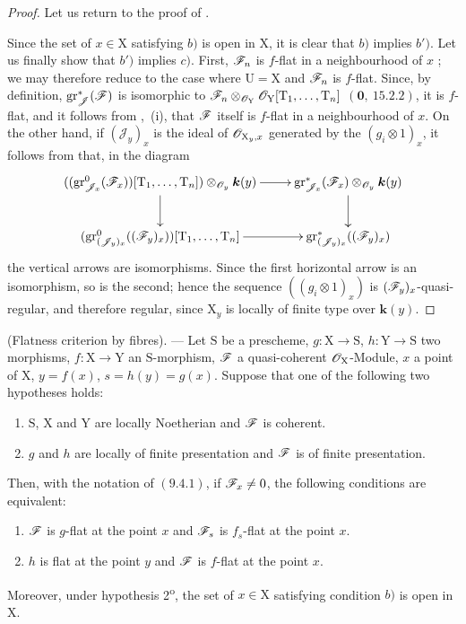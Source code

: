 \begin{proof}
Let us return to the proof of .

Since the set of $x\in\mathrm{X}$ satisfying $b)$ is open in $\mathrm{X}$, it is clear that $b)$ implies $b')$. Let us finally show that $b')$ implies $c)$. First, $\mathscr{F}_n$ is $f$-flat in a neighbourhood of $x$ ; we may therefore reduce to the case where $\mathrm{U}=\mathrm{X}$ and $\mathscr{F}_n$ is $f$-flat. Since, by definition, $\operatorname{gr}^*_\mathscr{J}(\mathscr{F})$ is isomorphic to $\mathscr{F}_n\otimes_{\mathscr{O}_\mathrm{Y}}\mathscr{O}_\mathrm{Y}[\mathrm{T}_1,\ldots,\mathrm{T}_n]$ $(\mathbf{0},~15.2.2)$, it is $f$-flat, and it follows from ,~(i), that $\mathscr{F}$ itself is $f$-flat in a neighbourhood of $x$. On the other hand, if $(\mathscr{J}_y)_x$ is the ideal of $\mathscr{O}_{\mathrm{X}_y,x}$ generated by the $(g_i\otimes 1)_x$, it follows from  that, in the diagram
\[
\xymatrix{
  ((\operatorname{gr}^0_{\mathscr{J}_x}(\sh{F}_x))[\mathrm{T}_1,\ldots,\mathrm{T}_n])\otimes_{\sh{O}_y}\boldsymbol{k}(y) \ar[r] \ar[d] & \operatorname{gr}^*_{\mathscr{J}_x}(\sh{F}_x)\otimes_{\sh{O}_y}\boldsymbol{k}(y) \ar[d] \\
  (\operatorname{gr}^0_{(\mathscr{J}_y)_x}((\sh{F}_y)_x))[\mathrm{T}_1,\ldots,\mathrm{T}_n] \ar[r] & \operatorname{gr}^*_{(\mathscr{J}_y)_x}((\sh{F}_y)_x)
}
\]
the vertical arrows are isomorphisms. Since the first horizontal arrow is an isomorphism, so is the second; hence the sequence $((g_i\otimes 1)_x)$ is $(\mathscr{F}_y)_x$-quasi-regular, and therefore regular, since $\mathrm{X}_y$ is locally of finite type over $\boldsymbol{k}(y)$.
\end{proof}

\begin{theorem}[11.3.10]
\label{IV.11.3.10}
(Flatness criterion by fibres). --- Let $\mathrm{S}$ be a prescheme, $g:\mathrm{X}\to\mathrm{S}$, $h:\mathrm{Y}\to\mathrm{S}$ two morphisms, $f:\mathrm{X}\to\mathrm{Y}$ an $\mathrm{S}$-morphism, $\mathscr{F}$ a quasi-coherent $\mathscr{O}_\mathrm{X}$-Module, $x$ a point of $\mathrm{X}$, $y=f(x)$, $s=h(y)=g(x)$. Suppose that one of the following two hypotheses holds:
\begin{enumerate}[label=\arabic{enumi}\textsuperscript{o}]
  \item $\mathrm{S}$, $\mathrm{X}$ and $\mathrm{Y}$ are locally Noetherian and $\mathscr{F}$ is coherent.
  \item $g$ and $h$ are locally of finite presentation and $\mathscr{F}$ is of finite presentation.
\end{enumerate}
Then, with the notation of $(9.4.1)$, if $\mathscr{F}_x\neq 0$, the following conditions are equivalent:
\begin{enumerate}[label=\emph{\alph*)}]
  \item $\mathscr{F}$ is $g$-flat at the point $x$ and $\mathscr{F}_s$ is $f_s$-flat at the point $x$.
  \item $h$ is flat at the point $y$ and $\mathscr{F}$ is $f$-flat at the point $x$.
\end{enumerate}
Moreover, under hypothesis 2\textsuperscript{o}, the set of $x\in\mathrm{X}$ satisfying condition $b)$ is open in $\mathrm{X}$.
\end{theorem}

